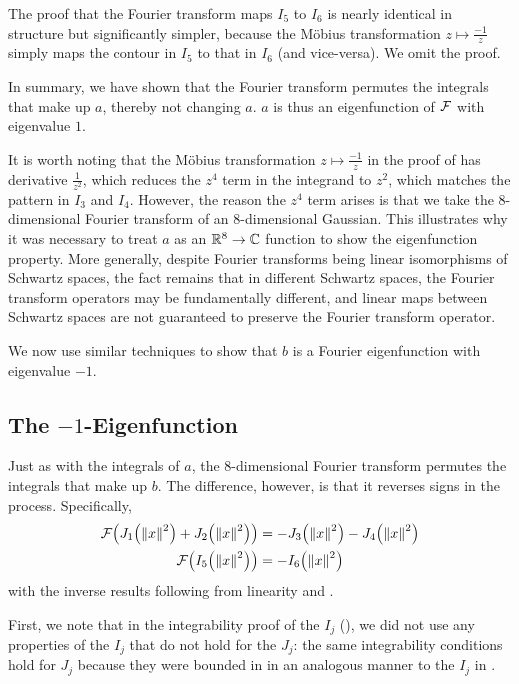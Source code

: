 The proof that the Fourier transform maps $I_5$ to $I_6$ is nearly identical in structure but significantly simpler, because the Möbius transformation $z \mapsto \frac{-1}{z}$ simply maps the contour in $I_5$ to that in $I_6$ (and vice-versa). We omit the proof.

In summary, we have shown that the Fourier transform permutes the integrals that make up $a$, thereby not changing $a$. $a$ is thus an eigenfunction of $\mathcal{F}$ with eigenvalue $1$.

It is worth noting that the Möbius transformation $z \mapsto \frac{-1}{z}$ in the proof of  has derivative $\frac{1}{z^2}$, which reduces the $z^4$ term in the integrand to $z^2$, which matches the pattern in $I_3$ and $I_4$. However, the reason the $z^4$ term arises is that we take the $8$-dimensional Fourier transform of an $8$-dimensional Gaussian. This illustrates why it was necessary to treat $a$ as an $\mathbb{R}^8 \to \mathbb{C}$ function to show the eigenfunction property. More generally, despite Fourier transforms being linear isomorphisms of Schwartz spaces, the fact remains that in different Schwartz spaces, the Fourier transform operators may be fundamentally different, and linear maps between Schwartz spaces are not guaranteed to preserve the Fourier transform operator.

We now use similar techniques to show that $b$ is a Fourier eigenfunction with eigenvalue $-1$. %

\subsection{The $-1$-Eigenfunction}

Just as with the integrals of $a$, the $8$-dimensional Fourier transform permutes the integrals that make up $b$. The difference, however, is that it reverses signs in the process. Specifically,
\begin{align}
    \F\of{J_1\of{\norm{x}^2} + J_2\of{\norm{x}^2}} &= -J_3\of{\norm{x}^2} - J_4\of{\norm{x}^2} \label{Ch4:Eq:b_is_eig_perm_12_34} \\
    \F\of{I_5\of{\norm{x}^2}} &= -I_6\of{\norm{x}^2} \label{Ch4:Eq:b_is_eig_perm_5_6}
\end{align}
with the inverse results following from linearity and .

First, we note that in the integrability proof of the $I_j$ (), we did not use any properties of the $I_j$ that do not hold for the $J_j$: the same integrability conditions hold for $J_j$ because they were bounded in  in an analogous manner to the $I_j$ in .

